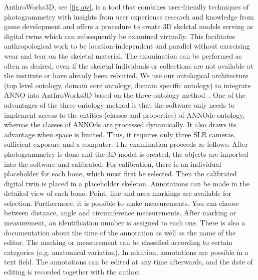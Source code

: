 \documentclass[sw]{iosart2x}
\newcommand{\aw}{AnthroWorks3D}
\begin{document}

\aw{}, see \cref{fig:aw}, is a tool that combines user-friendly techniques of photogrammetry with insights from user experience research and knowledge from game development and offers a procedure to create 3D skeletal models serving as  digital twins  which can subsequently be examined virtually.
This facilitates anthropological work to be location-independent and parallel without exercising wear and tear on the skeletal material.
The examination can be performed as often as desired, even if the skeletal individuals or collections are not available at the institute or have already been reburied.
%
We use our ontological architecture (top level ontology, domain core ontology, domain specific ontology) to integrate ANNO into \aw{} based on the three-ontology method~\cite{threeontologymethod}.
One of the advantages of the three-ontology method is that the software only needs to implement access to the entities (classes and properties) of ANNOdc ontology, whereas the classes of ANNOds are processed dynamically.
%
\iffalse
It also draws its advantage when space is limited.
Thus, it requires only three SLR cameras, sufficient exposure and a computer.
The examination proceeds as follows: After photogrammetry is done and the 3D model is created, the objects are imported into the software and calibrated.
For calibration, there is an individual placeholder for each bone, which must first be selected.
Then the calibrated digital twin is placed in a placeholder skeleton.
Annotations can be made in the detailed view of each bone.
Point, line and area markings are available for selection.
Furthermore, it is possible to make measurements.
You can choose between distance, angle and circumference measurements.
After marking or measurement, an identification number is assigned to each one.
There is also a documentation about the time of the annotation as well as the name of the editor.
The marking or measurement can be classified according to certain categories (e.g. anatomical variation).
In addition, annotations are possible in a text field.
The annotations can be edited at any time afterwards, and the date of editing is recorded together with the author.
\end{document}
